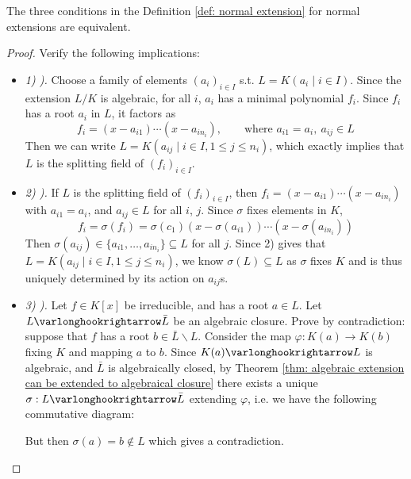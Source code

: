 \begin{proposition}
    The three conditions in the Definition \ref{def: normal extension} for normal extensions are equivalent. 
\end{proposition}

\begin{proof}
    Verify the following implications:
    \begin{itemize}
        \item \emph{1) ).} Choose a family of elements $(a_i)_{i \in I}$ s.t. $L = K(a_i \mid i \in I)$. Since the extension $L/K$ is algebraic, for all $i$, $a_i$ has a minimal polynomial $f_i$. Since $f_i$ has a root $a_i$ in $L$, it factors as
        \[
            f_i = (x - a_{i1}) \cdots (x - a_{i n_i}), \qquad \text{where } a_{i1} = a_i,\ a_{ij} \in L
        \]
        Then we can write $L = K(a_{ij} \mid i \in I, 1 \leq j \leq n_i)$, which exactly implies that $L$ is the splitting field of $(f_i)_{i \in I}$.
        \item \emph{2) ).} If $L$ is the splitting field of $(f_i)_{i \in I}$, then $f_i = (x - a_{i1}) \cdots (x - a_{i n_i})$ with $a_{i1} = a_i$, and $a_{ij} \in L$ for all $i$, $j$. Since $\sigma$ fixes elements in $K$, 
        \[
            f_i = \sigma(f_i) = \sigma(c_1) (x - \sigma(a_{i1})) \cdots (x - \sigma(a_{i n_i}))
        \]
        Then $\sigma(a_{ij}) \in \{a_{i1}, \dots, a_{i n_i}\} \subseteq L$ for all $j$. Since 2) gives that $L = K(a_{ij} \mid i \in I, 1 \leq j \leq n_i)$, we know $\sigma(L) \subseteq L$ as $\sigma$ fixes $K$ and is thus uniquely determined by its action on $a_{ij}$s.
        \item \emph{3) ).} Let $f \in K[x]$ be irreducible, and has a root $a \in L$. Let $L \ext \bar{L}$ be an algebraic closure. Prove by contradiction: suppose that $f$ has a root $b \in \bar{L} \smallsetminus L$. Consider the map $\varphi: K(a) \to K(b)$ fixing $K$ and mapping $a$ to $b$. Since $K(a) \ext L$ is algebraic, and $\bar{L}$ is algebraically closed, by Theorem \ref{thm: algebraic extension can be extended to algebraical closure} there exists a unique $\sigma: L \ext \bar{L}$ extending $\varphi$, i.e. we have the following commutative diagram:
        
        \begin{minipage}{\linewidth}
            \centering
        \end{minipage}
        But then $\sigma(a) = b \notin L$ which gives a contradiction.
    \end{itemize}
\end{proof}


